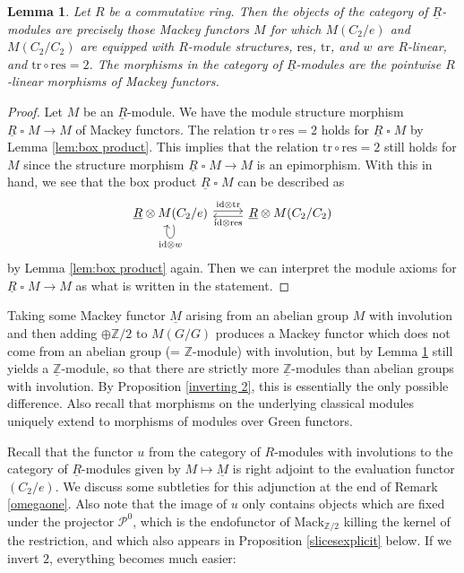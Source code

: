 \documentclass[10pt]{amsart}
\newtheorem{lem}[thm]{Lemma}
\theoremstyle{definition}
\numberwithin{equation}{section}
\newcommand{\Z}{\mathbb{Z}}
\newcommand{\cP}{\mathcal{P}}
\newcommand{\ul}{\underline}
\newcommand{\Mack}{\mathrm{Mack}}
\newcommand{\id}{\mathrm{id}}
\DeclareMathOperator{\sotimes}{\square}
\newcommand{\tr}{\mathrm{tr}}
\newcommand{\res}{\mathrm{res}}
\begin{document}
\begin{lem}
\label{lem:iotaR-modules}
Let $R$ be a commutative ring.
Then the objects of the category of $\ul{R}$-modules are precisely those Mackey functors $M$ for which $M(C_2/e)$ and $M(C_2/C_2)$ are equipped with $R$-module structures, $\res$, $\tr$, and $w$ are $R$-linear, and $\tr\circ \res=2$. 
The morphisms in the category of $\ul{R}$-modules are the pointwise $R$-linear morphisms of Mackey functors.
\end{lem}
\begin{proof}
Let $M$ be an $\ul{R}$-module.
We have the module structure morphism $\ul{R}\sotimes M\to M$ of Mackey functors.
The relation
$\tr\circ \res=2$
holds for $\ul{R}\sotimes M$ by Lemma \ref{lem:box product}.
This implies that the relation
$\tr\circ \res=2$ still holds for $M$ since the structure morphism $\ul{R}\sotimes M\to M$ is an epimorphism.
With this in hand,
we see that the box product $\ul{R}\sotimes M$ can be described as
\[
\begin{tikzcd}
\ul{R}\otimes M(C_2/e)\ar[loop below,"\id\otimes w"]\ar[r,shift left=0.5ex,"\id \otimes \tr"]\ar[r,shift right=0.5ex,leftarrow,"\id \otimes \res"']&
\ul{R}\otimes M(C_2/C_2)
\end{tikzcd}
\]
by Lemma \ref{lem:box product} again.
Then we can interpret the module axioms for $\ul{R}\sotimes M\to M$ as what is written in the statement. 
\end{proof}


Taking some Mackey functor $\ul{M}$ arising from an abelian group $M$ with involution and then adding $\oplus \Z/2$ to $M(G/G)$ produces a Mackey functor which does not come from an abelian group (=  $\Z$-module) with involution, but by Lemma \ref{lem:iotaR-modules} still yields a $\ul{\Z}$-module, so that there are strictly more $\ul{\Z}$-modules than abelian groups with involution.
By Proposition \ref{inverting 2}, this is essentially the only possible difference.
Also recall \cite[Lemma 2.2.3]{HP23} that morphisms on the underlying classical modules uniquely extend to morphisms of modules over Green functors.

Recall \cite[Lemma 2.2.3]{HP23} that the functor $u$ from the category of $R$-modules with involutions to the category of $\ul{R}$-modules given by $M\mapsto \ul{M}$ is right adjoint to the evaluation functor $(C_2/e)$.
We discuss some subtleties for this adjunction at the end of Remark \ref{omegaone}.
Also note that the image of $u$ only contains objects which are fixed under the projector $\cP^0$,
which is the endofunctor of $\Mack_{\Z/2}$ killing the kernel of the restriction, and which also appears in Proposition \ref{slicesexplicit} below.
If we invert $2$, everything becomes much easier:
\end{document}
